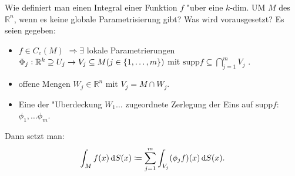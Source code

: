\documentclass[9pt]{article}
\newenvironment{field}{}{\newpage}
\newif\ifnote
\newenvironment{note}{\notetrue}{\notefalse}
\newcommand{\localtag}{}
\newcommand{\globaltag}{}
\newcommand{\uuid}{}
\newcommand{\tags}[1]{
    \ifnote 
        \renewcommand{\localtag}{#1}
    \else
        \renewcommand{\globaltag}{#1}
    \fi 
    }
\newcommand{\xplain}[1]{\renewcommand{\uuid}{#1}}
\begin{document}
\begin{note}
	\xplain{df4c7e7c-51ba-4722-81b8-95fbc5596d7b}
	\tags{definition, 1.3.10}
	\begin{field}
		Wie definiert man einen Integral einer  Funktion $f$ "uber eine $k$-dim. UM $M$ des $\mathbb{R}^n$, wenn es keine globale Parametrisierung gibt? Was wird vorausgesetzt?
	\end{field}
		\begin{field}
			Es seien gegeben:
			\begin{itemize}
				\item $f \in C_c (M)$ $\Rightarrow \exists$
				lokale Parametrierungen $\Phi_j : \mathbb{R}^k \supseteq U_j \rightarrow V_j \subseteq M (j \in \qty{1, \dots, m})$ mit $\text{supp}f\subseteq \bigcap^m_{j=1}V_j$ . 
				
				\item offene Mengen $W_j\in \mathbb{R}^n$ mit $V_j = M \cap W_j$.
				
				\item Eine der "Uberdeckung $W_1 \dots$ zugeordnete Zerlegung der Eins auf $\text{supp}f$:
				$\phi_1, \dots \phi_m$.
			\end{itemize}
		Dann setzt man:
		\begin{equation*}
		\int_M f(x) \dif S(x) \coloneqq \sum_{j=1}^m \int_{V_j} (\phi_j f)(x) \dif S(x).
		\end{equation*}
		\end{field}
\end{note}
\end{document}

